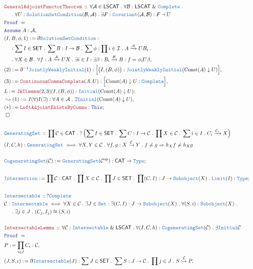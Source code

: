 \documentclass[12pt]{scrartcl}
\newcommand{\TYPE}[1]{\textcolor{NavyBlue}{\mathtt{#1}}}
\newcommand{\LOGIC}[1]{\textcolor{Blue}{\mathtt{#1}}}
\newcommand{\THM}[1]{\textcolor{Maroon}{\mathtt{#1}}}
\renewcommand{\.}{\; . \;}
\newcommand{\de}{: \kern 0.1pc =}
\newcommand{\Theorem}[2]{& \THM{#1} \, :: \, #2 \\ & \Proof = \\ }
\newcommand{\DeclareType}[2]{& \TYPE{#1} \, :: \, #2 \\}
\newcommand{\DefineType}[3]{& #1 : \TYPE{#2} \iff #3 \\}
\newcommand{\NewLine}{\\ & \kern 1pc}
\newcommand{\Page}[1]{ \begin{align*} #1 \end{align*}   }
\newcommand{ \bd }{ \ByDef }
\renewcommand{\And}{\; \& \;}
\newcommand{\Type}{\TYPE{Type}}
\newcommand{\ToMono}{\xhookrightarrow}
\newcommand{\Arrow}{\xrightarrow}
\newcommand{\Set}{\TYPE{Set}}
\newcommand{\Say}[3]{& #1 \de #2 : #3, \\}
\newcommand{\Conclude}[3]{& #1 \de #2 : #3; \\}
\newcommand{\Derive}[3]{& \leadsto #1 \de #2 : #3, \\}
\newcommand{\Assume}[2]{& \LOGIC{Assume} \; #1 : #2, \\}
\newcommand{\QED}{\; \square}
\newcommand{\EndProof}{& \QED \\}
\newcommand{\ByDef}{\eth}
\newcommand{\Proof}{\LOGIC{Proof} \; }
\newcommand{\Cov}{\TYPE{Covariant}}
\newcommand{\op}{\mathrm{op}}
\newcommand{\C}{\mathcal{C}}
\newcommand{\A}{\mathcal{A}}
\newcommand{\B}{\mathcal{B}}
\newcommand{\I}{\mathcal{I}}
\newcommand{\CAT}{\mathsf{CAT}}
\newcommand{\SET}{\mathsf{SET}}
\begin{document}
{}\Page{
	\Theorem{GeneralAdjointFunctorTheorem}{ 
			\forall \A \in  \mathsf{LSCAT} \.
			\forall \B : \mathsf{LSCAT} \And \TYPE{Complete} \. \NewLine 
			\. \forall U : \TYPE{SolutionSetCondition}(\B,\A) \.
			\exists F : \Cov(\A,\B) : F \dashv U
		}
    \Assume{A}{\A}
    \Say{(I,B,\phi,1)}{\bd \TYPE{SolutionSetCondition}}{
	    \NewLine :
	    \sum I \in \SET \. 
	    \sum B : I \to \B \. 
    	    \sum \phi : \prod i \in \I \. A \Arrow{\A} UB_i \. \NewLine \.
	    \forall X \in \B \. \forall f : A \Arrow{\A} UX \. 
	    \exists i \in I :
	    \exists \beta : B_i \Arrow{\B} B :
	    f = \phi_i U\beta
    }
    \Say{(2)}{\bd^{-1} \TYPE{JointlyWeaklyInitial}(1)}{
	    \Big[  \big(I,(B,\phi)\big) : \TYPE{JointlyWeaklyInitial}(\mathrm{Const}(A) \downarrow U)  \Big]}
    \Say{(3)}{\THM{ContinuousCommaComplete}(A,U) }{ \Big[ \mathrm{Const}(A) \downarrow  U : \TYPE{Complete} \Big]  }
    \Conclude{L}{\THM{JWILemma}(2,3)(I,(B,\phi))}{ \TYPE{Initial}(\mathrm{Const}(A) \downarrow U) }
    \Derive{(1)}{I(\forall)I(\exists)}{\forall A \in \A \. \exists \TYPE{Initial}(\mathrm{Const}(A) \downarrow U)}
    \Conclude{(*)}{\THM{LeftAdjointExistsByComma}}{\LOGIC{This}}
    \EndProof
    \\
    \DeclareType{GeneratingSet}
    {
	\prod \C \in \CAT \. 
	?\left(
	    	\sum I \in \SET \. 
		\sum  C : I \to \C \. 
		\prod X \in \C \. 
		\sum i \in I \. 
		C_i \Arrow{\C_i} X 
   	\right) 
   }
   \DefineType{(I,C,h)}{GeneratingSet}{ \forall X,Y \in \C \. \forall f,g : X \Arrow{\C} Y \. f \neq g \Rightarrow  
   	h_X f \neq h_X g}
   \\
   \Conclude{\TYPE{CogeneratingSet}(\C)}{\TYPE{GeneratingSet}(\C^\op)}{ \CAT \to \Type }
   \\
   \Conclude{\TYPE{Intersection}}{
	   	\prod \C : \CAT \.  
		\prod X \in \C \. 
		\prod J \in \SET \. 
		\prod (C,I) : J \to \TYPE{Subobject}(X) \. 
		\TYPE{Limit}(I)	
	}{\Type}
  	\\
  	\DeclareType{Intersectable}{? \TYPE{Complete}}
	\DefineType{\C}{Intersectable}{\forall X \in \C \. \exists J \in \Set : \exists (C,I) : 
  		J \to \TYPE{Subobject}(X) \. \forall (S,i) : \TYPE{Subobject}(X) \. 
		\NewLine \. \exists j \in J \. (C_j,I_j) \cong (S,i) }
	\\
	\Theorem{IntersectableLemma}{
		\forall \C : \TYPE{Intersectable} \And \mathsf{LSCAT} \. 
		\forall (I,C,h) : \TYPE{CogeneratingSet}(\C) \.
		\exists \TYPE{Initial}{\C}
	}
	\Say{P}{\prod_{i \in I} C_i}{\C}
	\Say{(J,S,\iota)}{\bd \TYPE{Intersectable}(J)}
	{ \sum J \in \SET \. \sum S : J \to \C \. \prod j \in J \. S  \ToMono{\C} P }
}
\end{document}
